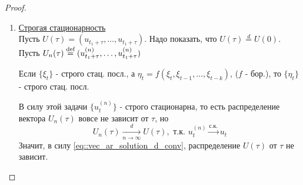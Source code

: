 \begin{proof}
\begin{enumerate}
        \item \underline{Строгая стационарность} \\
        Пусть $U(\tau)=(u_{t_1+\tau},\ldots,u_{t_1+\tau})$. Надо показать, что $U(\tau)\overset{d}{=}U(0)$. \\
        Пусть $U_n(\tau)\stackrel{\text{def}}{=}(u^{(n)}_{t_1+\tau},\ldots,u^{(n)}_{t_1+\tau})$
        \begin{task}
            Если $\{\xi_t\}$ - строго стац. посл., а $\eta_t=f(\xi_t,\xi_{t-1},\ldots,\xi_{t-k})$, ($f$ - бор.),
            то $\{\eta_t\}$ - строго стац. посл.
        \end{task}
        В силу этой задачи $\{u_t^{(n)}\}$ - строго стационарна, то есть распределение вектора $U_n(\tau)$
        вовсе не зависит от $\tau$, но
        \begin{equation}\label{eq::vec_ar_solution_d_conv}
            U_n(\tau)\underset{n\rightarrow\infty}{\xrightarrow{d}}U(\tau),\text{ т.к. } u_t^{(n)}\xrightarrow{\text{с.к.}}u_t
        \end{equation}
        Значит, в силу \eqref{eq::vec_ar_solution_d_conv}, распределение $U(\tau)$ от $\tau$ не зависит.
        

\end{enumerate}
\end{proof}
